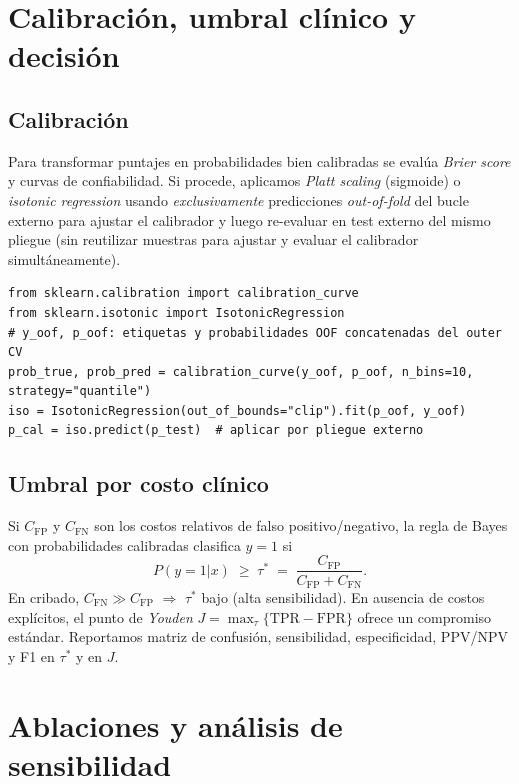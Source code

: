 \section{Calibración, umbral clínico y decisión}
\label{sec:calibration_threshold}

\subsection{Calibración}
Para transformar puntajes en probabilidades bien calibradas se evalúa \emph{Brier score} y curvas de confiabilidad. Si procede, aplicamos \emph{Platt scaling} (sigmoide) o \emph{isotonic regression} usando \emph{exclusivamente} predicciones \emph{out-of-fold} del bucle externo para ajustar el calibrador y luego re-evaluar en test externo del mismo pliegue (sin reutilizar muestras para ajustar y evaluar el calibrador simultáneamente).

\begin{verbatim}
from sklearn.calibration import calibration_curve
from sklearn.isotonic import IsotonicRegression
# y_oof, p_oof: etiquetas y probabilidades OOF concatenadas del outer CV
prob_true, prob_pred = calibration_curve(y_oof, p_oof, n_bins=10, strategy="quantile")
iso = IsotonicRegression(out_of_bounds="clip").fit(p_oof, y_oof)
p_cal = iso.predict(p_test)  # aplicar por pliegue externo
\end{verbatim}

\subsection{Umbral por costo clínico}
Si $C_{\mathrm{FP}}$ y $C_{\mathrm{FN}}$ son los costos relativos de falso positivo/negativo, la regla de Bayes con probabilidades calibradas clasifica $y=1$ si
\begin{equation}
P(y{=}1|x) \;\ge\; \tau^\ast \;=\; \frac{C_{\mathrm{FP}}}{C_{\mathrm{FP}}+C_{\mathrm{FN}}}.
\label{eq:tau_cost}
\end{equation}
En cribado, $C_{\mathrm{FN}}\gg C_{\mathrm{FP}}$ $\Rightarrow$ $\tau^\ast$ bajo (alta sensibilidad). En ausencia de costos explícitos, el punto de \emph{Youden} $J=\max_\tau \{\mathrm{TPR}-\mathrm{FPR}\}$ ofrece un compromiso estándar. Reportamos matriz de confusión, sensibilidad, especificidad, PPV/NPV y F1 en $\tau^\ast$ y en $J$.

\section{Ablaciones y análisis de sensibilidad}
\label{sec:ablations}

